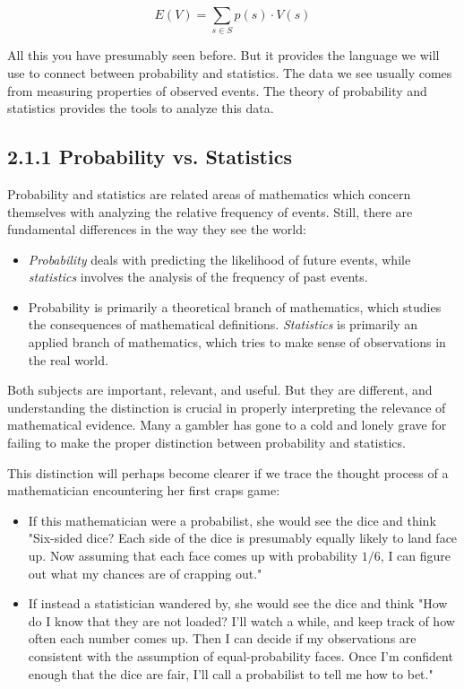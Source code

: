 \documentclass[10pt]{article}
\begin{document}
\[
E(V)=\sum_{s \in S} p(s) \cdot V(s)
\]

All this you have presumably seen before. But it provides the language we will use to connect between probability and statistics. The data we see usually comes from measuring properties of observed events. The theory of probability and statistics provides the tools to analyze this data.

\subsection*{2.1.1 Probability vs. Statistics}
Probability and statistics are related areas of mathematics which concern themselves with analyzing the relative frequency of events. Still, there are fundamental differences in the way they see the world:

\begin{itemize}
  \item \textit{Probability} deals with predicting the likelihood of future events, while \textit{statistics} involves the analysis of the frequency of past events.

  \item Probability is primarily a theoretical branch of mathematics, which studies the consequences of mathematical definitions. \textit{Statistics} is primarily an applied branch of mathematics, which tries to make sense of observations in the real world.
\end{itemize}

Both subjects are important, relevant, and useful. But they are different, and understanding the distinction is crucial in properly interpreting the relevance of mathematical evidence. Many a gambler has gone to a cold and lonely grave for failing to make the proper distinction between probability and statistics.

This distinction will perhaps become clearer if we trace the thought process of a mathematician encountering her first craps game:

\begin{itemize}
  \item If this mathematician were a probabilist, she would see the dice and think "Six-sided dice? Each side of the dice is presumably equally likely to land face up. Now assuming that each face comes up with probability \(1 / 6\), I can figure out what my chances are of crapping out."

  \item If instead a statistician wandered by, she would see the dice and think "How do I know that they are not loaded? I'll watch a while, and keep track of how often each number comes up. Then I can decide if my observations are consistent with the assumption of equal-probability faces. Once I'm confident enough that the dice are fair, I'll call a probabilist to tell me how to bet."
\end{itemize}
\end{document}
